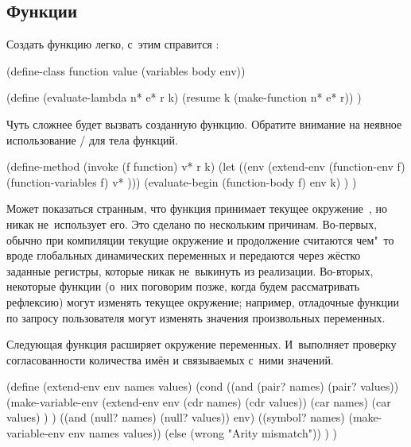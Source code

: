 \subsection{Функции}\label{escape/actors/ssect:functions}

Создать функцию легко, с~этим справится :

\begin{code:lisp}
(define-class function value (variables body env))

(define (evaluate-lambda n* e* r k)
  (resume k (make-function n* e* r)) )
\end{code:lisp}

Чуть сложнее будет вызвать созданную функцию. Обратите внимание на неявное
использование / для тела функций.

\begin{code:lisp}
(define-method (invoke (f function) v* r k)
  (let ((env (extend-env (function-env f)
                         (function-variables f)
                         v* )))
    (evaluate-begin (function-body f) env k) ) )
\end{code:lisp}

Может показаться странным, что функция принимает текущее окружение~, но
никак не~использует его. Это сделано по нескольким причинам. Во-первых, обычно
при компиляции текущие окружение и продолжение считаются чем"~то вроде
глобальных динамических переменных и передаются через жёстко заданные регистры,
которые никак не~выкинуть из реализации. Во-вторых, некоторые функции (о~них
поговорим позже, когда будем рассматривать рефлексию) могут изменять текущее
окружение; например, отладочные функции по запросу пользователя могут изменять
значения произвольных переменных.

Следующая функция расширяет окружение переменных. И~выполняет проверку
согласованности количества имён и связываемых с~ними значений.

\begin{code:lisp}
(define (extend-env env names values)
  (cond ((and (pair? names) (pair? values))
         (make-variable-env
          (extend-env env (cdr names) (cdr values))
          (car names)
          (car values) ) )
        ((and (null? names) (null? values)) env)
        ((symbol? names) (make-variable-env env names values))
        (else (wrong "Arity mismatch")) ) )
\end{code:lisp}

